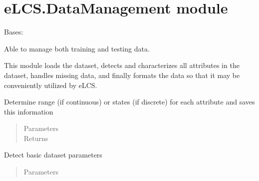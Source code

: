 \documentclass[letterpaper,10pt,english]{sphinxmanual}
\begin{document}
\section{eLCS.DataManagement module}
\label{\detokenize{eLCS:module-eLCS.DataManagement}}\label{\detokenize{eLCS:elcs-datamanagement-module}}

\begin{fulllineitems}
\label{\detokenize{eLCS:eLCS.DataManagement.DataManagement}}
Bases: 

Able to manage both training and testing data.

This module loads the dataset, detects and characterizes all attributes in the dataset,
handles missing data, and finally formats the data so that it may be conveniently utilized by eLCS.

\begin{fulllineitems}
\label{\detokenize{eLCS:eLCS.DataManagement.DataManagement.characterizeAttributes}}
Determine range (if continuous) or states (if discrete) for each attribute and saves this information
\begin{quote}\begin{description}
\item[{Parameters}] \leavevmode
{} \textendash{} 

\item[{Returns}] \leavevmode


\end{description}\end{quote}

\end{fulllineitems}


\begin{fulllineitems}
\label{\detokenize{eLCS:eLCS.DataManagement.DataManagement.characterizeDataset}}
Detect basic dataset parameters
\begin{quote}\begin{description}
\item[{Parameters}] \leavevmode
{} \textendash{} 


\end{description}
\end{quote}
\end{fulllineitems}
\end{fulllineitems}
\end{document}
